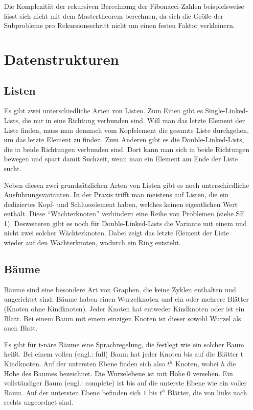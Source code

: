 \documentclass[10pt,a4paper,oneside,ngerman,numbers=noenddot]{scrartcl}
\begin{document}
	Die Komplexität der rekursiven Berechnung der Fibonacci-Zahlen beispielsweise lässt sich nicht mit dem Mastertheorem berechnen, da sich die Größe der Subprobleme pro Rekursionsschritt nicht um einen festen Faktor verkleinern.
	
\section{Datenstrukturen}

	\subsection{Listen}
	
		Es gibt zwei unterschiedliche Arten von Listen. Zum Einen gibt es Single-Linked-Lists, die nur in eine Richtung verbunden sind. Will man das letzte Element der Liste finden, muss man demnach vom Kopfelement die gesamte Liste durchgehen, um das letzte Element zu finden. Zum Anderen gibt es die Double-Linked-Lists, die in beide Richtungen verbunden sind. Dort kann man sich in beide Richtungen bewegen und spart damit Suchzeit, wenn man ein Element am Ende der Liste sucht.
		
		Neben diesen zwei grundsätzlichen Arten von Listen gibt es noch unterschiedliche Ausführungsvarianten. In der Praxis trifft man meistens auf Listen, die ein dediziertes Kopf- und Schlusselement haben, welches keinen eigentlichen Wert enthält. Diese "`Wächterknoten"' verhindern eine Reihe von Problemen (siehe SE 1). Desweiteren gibt es noch für Double-Linked-Lists die Variante mit einem und nicht zwei solcher Wächterknoten. Dabei zeigt das letzte Element der Liste wieder auf den Wächterknoten, wodurch ein Ring entsteht.
		
	\subsection{Bäume}
	
		Bäume sind eine besondere Art von Graphen, die keine Zyklen enthalten und ungerichtet sind. Bäume haben einen Wurzelknoten und ein oder mehrere Blätter (Knoten ohne Kindknoten). Jeder Knoten hat entweder Kindknoten oder ist ein Blatt. Bei einem Baum mit einem einzigen Knoten ist dieser sowohl Wurzel als auch Blatt.
		
		Es gibt für t-näre Bäume eine Sprachregelung, die festlegt wie ein solcher Baum heißt. Bei einem vollen (engl.: full) Baum hat jeder Knoten bis auf die Blätter t Kindknoten. Auf der untersten Ebene finden sich also $t^{h}$ Knoten, wobei $h$ die Höhe des Baumes bezeichnet. Die Wurzelebene ist mit Höhe $0$ versehen. Ein vollständiger Baum (engl.: complete) ist bis auf die unterste Ebene wie ein voller Baum. Auf der untersten Ebene befinden sich $1$ bis $t^{h}$ Blätter, die von links nach rechts angeordnet sind.
		
\end{document}
